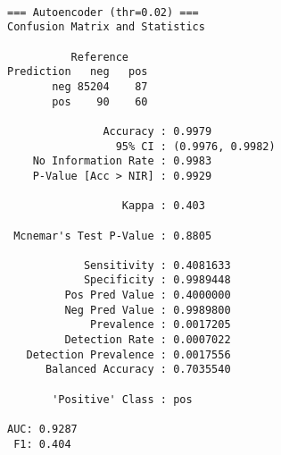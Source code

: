 \documentclass[
  11pt,
  letterpaper,
  DIV=11,
  numbers=noendperiod]{scrartcl}
\newenvironment{Shaded}{}{}
\newcommand{\DocumentationTok}[1]{\textcolor[rgb]{0.42,0.45,0.49}{#1}}
\newcommand{\FunctionTok}[1]{\textcolor[rgb]{0.44,0.26,0.76}{#1}}
\newcommand{\NormalTok}[1]{\textcolor[rgb]{0.14,0.16,0.18}{#1}}
\newcommand{\OtherTok}[1]{\textcolor[rgb]{0.44,0.26,0.76}{#1}}
\newcommand{\SpecialCharTok}[1]{\textcolor[rgb]{0.00,0.36,0.77}{#1}}
\newcommand{\StringTok}[1]{\textcolor[rgb]{0.01,0.18,0.38}{#1}}
\begin{document}
\begin{verbatim}

=== Autoencoder (thr=0.02) ===
Confusion Matrix and Statistics

          Reference
Prediction   neg   pos
       neg 85204    87
       pos    90    60
                                          
               Accuracy : 0.9979          
                 95% CI : (0.9976, 0.9982)
    No Information Rate : 0.9983          
    P-Value [Acc > NIR] : 0.9929          
                                          
                  Kappa : 0.403           
                                          
 Mcnemar's Test P-Value : 0.8805          
                                          
            Sensitivity : 0.4081633       
            Specificity : 0.9989448       
         Pos Pred Value : 0.4000000       
         Neg Pred Value : 0.9989800       
             Prevalence : 0.0017205       
         Detection Rate : 0.0007022       
   Detection Prevalence : 0.0017556       
      Balanced Accuracy : 0.7035540       
                                          
       'Positive' Class : pos             
                                          
AUC: 0.9287 
 F1: 0.404 
\end{verbatim}

\begin{Shaded}
\end{Shaded}
\end{document}
